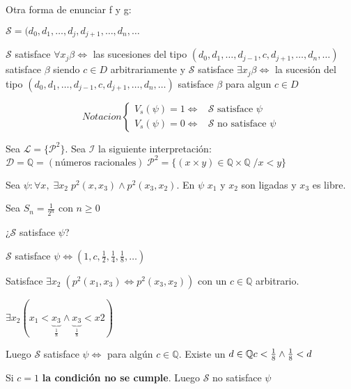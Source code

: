 \begin{definition}

Otra forma de enunciar f y g:

$\mathcal{S} = (d_0, d_1, \ldots, d_j, d_{j + 1}, \ldots, d_n, \ldots$

$\mathcal{S}$ satisface $\forall x_j \beta \iff $ las sucesiones del tipo $(d_0, d_1, \ldots, d_{j-1}, c, d_{j+1}, \ldots, d_n, \ldots)$ satisface $\beta$ siendo $c \in D$ arbitrariamente y $\mathcal{S}$ satisface $\exists x_j \beta \iff$ la sucesi\'on del tipo $(d_0, d_1, \ldots, d_{j-1}, c, d_{j+1}, \ldots, d_n, \ldots)$ satisface $\beta$ para algun $c \in D$

\[
Notacion 
\begin{cases}
	V_s(\psi) = 1 \iff &\mathcal{S}\text{ satisface } \psi \\
	V_s(\psi) = 0 \iff &\mathcal{S}\text{ no satisface } \psi
\end{cases}
\]

\end{definition}

\begin{example}

Sea $\mathcal{L} = \{ \mathcal{P}^2\}$. Sea $\mathcal{I}$ la siguiente interpretaci\'on: $\mathcal{D} = \mathbb{Q} = (\text{n\'umeros racionales}) \; \mathcal{P}^2 = \{ (x \times y) \in \mathbb{Q} \times \mathbb{Q} \; / x < y \}$

Sea $\psi: \forall x, \; \exists x_2 \; p^2 (x, x_3) \land p^2(x_3, x_2)$. En $\psi$ $x_1$ y $x_2$ son ligadas y $x_3$ es libre.

Sea $S_n = \frac{1}{2^n}$ con $n \geq 0$

¿$\mathcal{S}$ satisface $\psi$? 

$\mathcal{S}$ satisface $\psi \iff \left( 1, c, \frac{1}{2}, \frac{1}{4}, \frac{1}{8}, \ldots \right)$

Satisface $\exists x_2 \; (p^2(x_1, x_3) \iff p^2(x_3, x_2))$ con un $c \in \mathbb{Q}$ arbitrario.

$\exists x_2 (x_1 < \underbrace{x_3}_{\frac{1}{8}}  \land \underbrace{x_3}_{\frac{1}{8}} < x2)$

Luego $\mathcal{S}$ satisface $\psi \iff $ para alg\'un $c \in \mathbb{Q}$. Existe un $d \in \mathbb{Q} \/ c < \frac{1}{8} \land \frac{1}{8} < d$

Si $c = 1$ \textbf{la condici\'on no se cumple}. Luego $\mathcal{S}$ no satisface $\psi$

\end{example}

